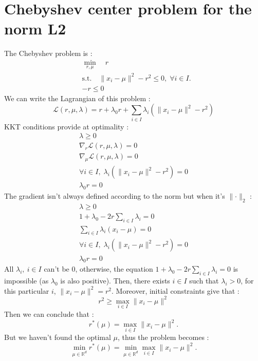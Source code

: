 \documentclass{amsart}
\newcommand{\RR}{\mathbb{R}}
\begin{document}
\section{Chebyshev center problem for the norm L2}
\label{chebyshev}
The Chebyshev problem is :
\begin{align*}
    &\min_{r,\mu} \quad r\\
    &\text{s.t.}\quad \lVert x_i-\mu\rVert^2-r^2 \leq 0, \;\forall i\in I.\\
    &-r\leq0
\end{align*}
We can write the Lagrangian of this problem : 
$$
\mathcal{L}(r,\mu,\lambda)=r+\lambda_0r+\sum_{i\in I}\lambda_i(\lVert x_i-\mu\rVert^2-r^2)
$$
KKT conditions provide at optimality : \begin{align*}
    \lambda\geq0\\
    \nabla_r\mathcal{L}(r,\mu,\lambda)=0\\
    \nabla_\mu\mathcal{L}(r,\mu,\lambda)=0\\
    \forall i\in I,\;\lambda_i(\lVert x_i-\mu\rVert^2-r^2)=0 \\
    \lambda_0r=0
\end{align*}
The gradient isn't always defined according to the norm but when it's $\lVert\cdot\rVert_2$ : 
\begin{align*}
    \lambda\geq0\\
    1+\lambda_0-2r\sum_{i\in I}\lambda_i=0\\
    \sum_{i\in I}\lambda_i(x_i-\mu)=0\\
    \forall i\in I,\;\lambda_i(\lVert x_i-\mu\rVert^2-r^2)=0 \\
    \lambda_0r=0
\end{align*}
All $\lambda_i, \: i\in I$ can't be $0$, otherwise, the equation $1+\lambda_0-2r\sum_{i\in I}\lambda_i=0$ is impossible (as $\lambda_0$ is also positive). Then, there exists $i\in I$ such that $\lambda_i>0$, for this particular $i$, $\lVert x_i-\mu\lVert^2=r^2$. Moreover, initial constraints give that :
$$
r^2\geq \max_{i\in I}\lVert x_i-\mu \rVert^2
$$
Then we can conclude that :
$$
r^*\left(\mu\right)=\max_{i\in I}\lVert x_i-\mu\rVert^2.
$$
But we haven't found the optimal $\mu$, thus the problem becomes : 
$$
\min_{\mu\in\RR^d}r^*\left(\mu\right)=\min_{\mu\in\RR^d}\max_{i\in I}\lVert x_i-\mu\rVert^2.
$$



\end{document}
